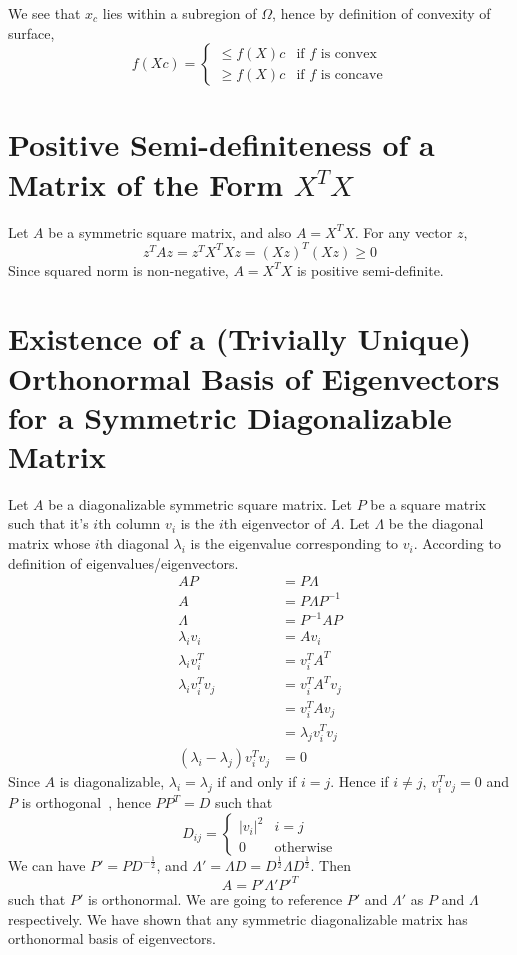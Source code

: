\documentclass{book}
\numberwithin{equation}{subsection}
\begin{document}
We see that $x_c$ lies within a subregion of $\Omega$, hence by definition of convexity of surface, 
\begin{equation}
    f(Xc) = 
    \begin{cases}
        \leq  f(X)c & \text{if $f$ is convex}\\
        \geq  f(X)c & \text{if $f$ is concave}
    \end{cases}
\end{equation}
\section{Positive Semi-definiteness of a Matrix of the Form $X^TX$}
Let $A$ be a symmetric square matrix, and also $A=X^TX$. For any vector $z$, 
\begin{equation}
z^TAz = z^TX^TXz = (Xz)^T(Xz) \geq 0
\end{equation}
Since squared norm is non-negative, $A=X^TX$ is positive semi-definite.
\section{Existence of a (Trivially Unique) Orthonormal Basis of Eigenvectors for a Symmetric Diagonalizable Matrix}
Let $A$ be a diagonalizable symmetric square matrix. Let $P$ be a square matrix such that it's $i$th column $v_i$ is the $i$th eigenvector of $A$. Let $\Lambda$ be the diagonal matrix whose $i$th diagonal $\lambda_i$ is the eigenvalue corresponding to $v_i$. According to definition of eigenvalues/eigenvectors.
\begin{align}
    AP &= P\Lambda\\
    A &= P\Lambda P^{-1}\\
    \Lambda &= P^{-1}AP\\
    \lambda_iv_i &= Av_i\\
    \lambda_iv_i^T &= v_i^TA^T\\
    \lambda_iv_i^Tv_j &= v_i^TA^Tv_j\\
    &= v_i^TAv_j\\
    &= \lambda_jv_i^Tv_j\\
    (\lambda_i-\lambda_j)v_i^Tv_j &= 0
\end{align}
Since $A$ is diagonalizable, $\lambda_i=\lambda_j$ if and only if $i=j$. Hence if $i \neq j$, $v_i^Tv_j = 0$ and $P$ is orthogonal~\cite{magidin_linear_2011}, hence 
$PP^T = D$ such that 
\begin{equation}
D_{ij} = \begin{cases}
    |v_i|^2 & i = j\\
    0 & \text{otherwise}
\end{cases}
\end{equation}
We can have $P' = PD^{-\frac{1}{2}}$, and $\Lambda' = \Lambda D = D^{\frac{1}{2}} \Lambda D^{\frac{1}{2}}$. Then
\begin{equation}
    A = P'\Lambda'P'^T 
\end{equation}
such that $P'$ is orthonormal. We are going to reference $P'$ and $\Lambda'$ as $P$ and $\Lambda$ respectively. We have shown that any symmetric diagonalizable matrix has orthonormal basis of eigenvectors.
\end{document}
